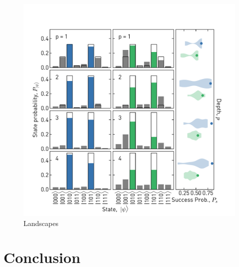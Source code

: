 \begin{figure}[ht]
    \centering
    \includegraphics[width=\textwidth]{chapters/qaoa/figs/ch5_qaoa_state_histograms_20200202_134816.pdf}
    \caption{Landscapes}
    \label{fig:qaoa_state_histogram}
\end{figure}
\section{Conclusion}
